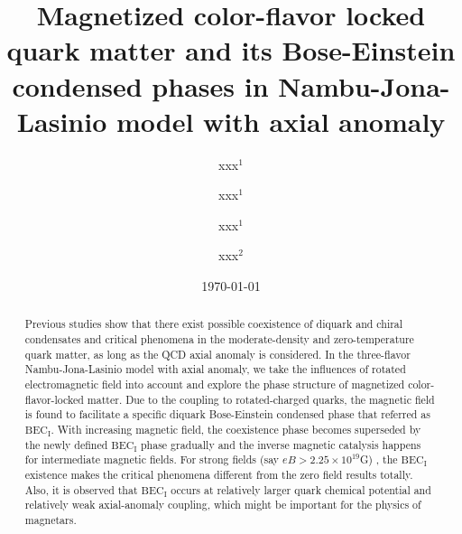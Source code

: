 \documentclass[prd, showpacs,nofootinbib,amsmath,amssymb,12pt]{revtex4}
\begin{document}
\title{Magnetized color-flavor locked quark matter and its Bose-Einstein condensed phases in Nambu-Jona-Lasinio model with axial anomaly }
\author{xxx$^1$}
\author{xxx$^1$}
\author{xxx$^1$}
\author{xxx$^2$}

\date{\today}
\begin{abstract}
Previous studies show that there exist possible coexistence of diquark and chiral condensates and  critical phenomena in the moderate-density and zero-temperature quark matter,
as long as the QCD axial anomaly is considered.
In the three-flavor Nambu-Jona-Lasinio model with axial anomaly,
we take the influences of rotated electromagnetic field into account and explore the phase structure of  magnetized color-flavor-locked  matter.
Due to the coupling to rotated-charged quarks, the magnetic field is found to facilitate a specific diquark Bose-Einstein condensed phase that referred as $\text{BEC}_\text{I}$.
 With increasing magnetic field, the coexistence phase becomes superseded  by the newly defined $\text{BEC}_\text{I}$ phase gradually and the inverse magnetic catalysis happens for intermediate magnetic fields. For strong fields (say $eB>2.25\times10^{19}$G) , the $\text{BEC}_\text{I}$ existence makes the critical phenomena different from the zero field results   totally.
Also, it is observed that   $\text{BEC}_\text{I}$   occurs at relatively larger quark chemical potential and  relatively weak axial-anomaly coupling, which might be important for  the physics of magnetars.

\end{abstract}
\maketitle
\end{document}

